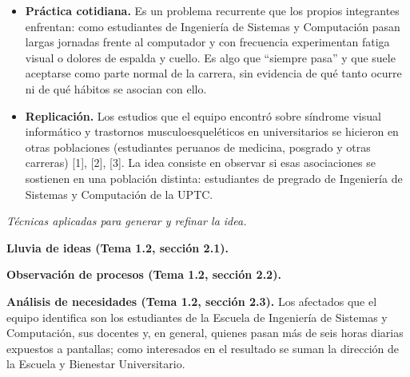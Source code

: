 \begin{itemize}[leftmargin=1.5em,itemsep=0.3em]
  \item \textbf{Práctica cotidiana.} Es un problema recurrente que los propios
  integrantes enfrentan: como estudiantes de Ingeniería de Sistemas y Computación
  pasan largas jornadas frente al computador y con frecuencia experimentan fatiga
  visual o dolores de espalda y cuello. Es algo que ``siempre pasa'' y que suele
  aceptarse como parte normal de la carrera, sin evidencia de qué tanto ocurre ni
  de qué hábitos se asocian con ello.
  \item \textbf{Replicación.} Los estudios que el equipo encontró sobre síndrome
  visual informático y trastornos musculoesqueléticos en universitarios se hicieron
  en otras poblaciones (estudiantes peruanos de medicina, posgrado y otras carreras)
  [1], [2], [3]. La idea consiste en observar si esas asociaciones se sostienen en
  una población distinta: estudiantes de pregrado de Ingeniería de Sistemas y
  Computación de la UPTC.
\end{itemize}

\medskip
\noindent\emph{Técnicas aplicadas para generar y refinar la idea.}

\smallskip
\noindent\textbf{Lluvia de ideas (Tema 1.2, sección 2.1).}

\smallskip
\noindent\textbf{Observación de procesos (Tema 1.2, sección 2.2).}

\smallskip
\noindent\textbf{Análisis de necesidades (Tema 1.2, sección 2.3).}
Los afectados que el equipo identifica son los estudiantes de la Escuela de
Ingeniería de Sistemas y Computación, sus docentes y, en general, quienes pasan más
de seis horas diarias expuestos a pantallas; como interesados en el resultado se
suman la dirección de la Escuela y Bienestar Universitario.

